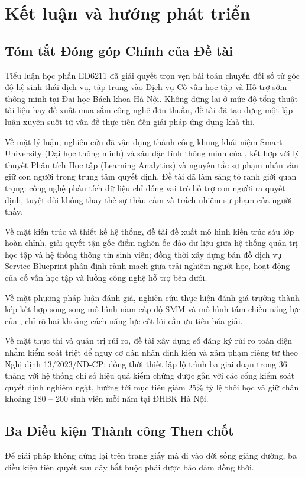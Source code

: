 \section{Kết luận và hướng phát triển}

\subsection{Tóm tắt Đóng góp Chính của Đề tài}
Tiểu luận học phần ED6211 đã giải quyết trọn vẹn bài toán chuyển đổi số từ góc độ hệ sinh thái dịch vụ, tập trung vào Dịch vụ Cố vấn học tập và Hỗ trợ sớm thông minh tại Đại học Bách khoa Hà Nội. Không dừng lại ở mức độ tổng thuật tài liệu hay đề xuất mua sắm công nghệ đơn thuần, đề tài đã tạo dựng một lập luận xuyên suốt từ vấn đề thực tiễn đến giải pháp ứng dụng khả thi.

Về mặt lý luận, nghiên cứu đã vận dụng thành công khung khái niệm Smart University (Đại học thông minh) và sáu đặc tính thông minh của \citet{uskov2018}, kết hợp với lý thuyết Phân tích Học tập (Learning Analytics) và nguyên tắc sư phạm nhân văn giữ con người trong trung tâm quyết định. Đề tài đã làm sáng tỏ ranh giới quan trọng: công nghệ phân tích dữ liệu chỉ đóng vai trò hỗ trợ con người ra quyết định, tuyệt đối không thay thế sự thấu cảm và trách nhiệm sư phạm của người thầy.

Về mặt kiến trúc và thiết kế hệ thống, đề tài đề xuất mô hình kiến trúc sáu lớp hoàn chỉnh, giải quyết tận gốc điểm nghẽn ốc đảo dữ liệu giữa hệ thống quản trị học tập và hệ thống thông tin sinh viên; đồng thời xây dựng bản đồ dịch vụ Service Blueprint phân định rành mạch giữa trải nghiệm người học, hoạt động của cố vấn học tập và luồng công nghệ hỗ trợ bên dưới.

Về mặt phương pháp luận đánh giá, nghiên cứu thực hiện đánh giá trưởng thành kép kết hợp song song mô hình năm cấp độ SMM và mô hình tám chiều năng lực của \citet{amiri2026}, chỉ rõ hai khoảng cách năng lực cốt lõi cần ưu tiên hóa giải. 

Về mặt thực thi và quản trị rủi ro, đề tài xây dựng sổ đăng ký rủi ro toàn diện nhằm kiểm soát triệt để nguy cơ dán nhãn định kiến và xâm phạm riêng tư theo Nghị định 13/2023/NĐ-CP; đồng thời thiết lập lộ trình ba giai đoạn trong 36 tháng với hệ thống chỉ số hiệu quả kiểm chứng được gắn với các cổng kiểm soát quyết định nghiêm ngặt, hướng tới mục tiêu giảm 25\% tỷ lệ thôi học và giữ chân khoảng 180 -- 200 sinh viên mỗi năm tại ĐHBK Hà Nội.

\subsection{Ba Điều kiện Thành công Then chốt}
Để giải pháp không dừng lại trên trang giấy mà đi vào đời sống giảng đường, ba điều kiện tiên quyết sau đây bắt buộc phải được bảo đảm đồng thời.

